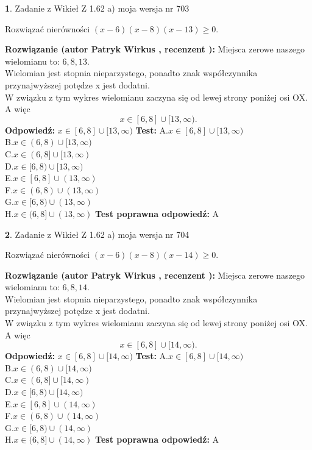 \documentclass[12pt, a4paper]{article}
\theoremstyle{definition} %
\newtheorem{zad}{}
\newcommand{\zadStart}[1]{\begin{zad}#1\newline}
\newcommand{\zadStop}{\end{zad}}
\newcommand{\rozwStart}[2]{\noindent \textbf{Rozwiązanie (autor #1 , recenzent #2): }\newline}
\newcommand{\rozwStop}{\newline}
\newcommand{\odpStart}{\noindent \textbf{Odpowiedź:}\newline}
\newcommand{\odpStop}{\newline}
\newcommand{\testStart}{\noindent \textbf{Test:}\newline}
\newcommand{\testStop}{\newline}
\newcommand{\kluczStart}{\noindent \textbf{Test poprawna odpowiedź:}\newline}
\newcommand{\kluczStop}{\newline}
\begin{document}
\zadStart{Zadanie z Wikieł Z 1.62 a) moja wersja nr 703}

Rozwiązać nierówności $(x-6)(x-8)(x-13)\ge0$.
\zadStop
\rozwStart{Patryk Wirkus}{}
Miejsca zerowe naszego wielomianu to: $6, 8, 13$.\\
Wielomian jest stopnia nieparzystego, ponadto znak współczynnika przy\linebreak najwyższej potędze x jest dodatni.\\ W związku z tym wykres wielomianu zaczyna się od lewej strony poniżej osi OX. A więc $$x \in [6,8] \cup [13,\infty).$$
\rozwStop
\odpStart
$x \in [6,8] \cup [13,\infty)$
\odpStop
\testStart
A.$x \in [6,8] \cup [13,\infty)$\\
B.$x \in (6,8) \cup [13,\infty)$\\
C.$x \in (6,8] \cup [13,\infty)$\\
D.$x \in [6,8) \cup [13,\infty)$\\
E.$x \in [6,8] \cup (13,\infty)$\\
F.$x \in (6,8) \cup (13,\infty)$\\
G.$x \in [6,8) \cup (13,\infty)$\\
H.$x \in (6,8] \cup (13,\infty)$
\testStop
\kluczStart
A
\kluczStop



\zadStart{Zadanie z Wikieł Z 1.62 a) moja wersja nr 704}

Rozwiązać nierówności $(x-6)(x-8)(x-14)\ge0$.
\zadStop
\rozwStart{Patryk Wirkus}{}
Miejsca zerowe naszego wielomianu to: $6, 8, 14$.\\
Wielomian jest stopnia nieparzystego, ponadto znak współczynnika przy\linebreak najwyższej potędze x jest dodatni.\\ W związku z tym wykres wielomianu zaczyna się od lewej strony poniżej osi OX. A więc $$x \in [6,8] \cup [14,\infty).$$
\rozwStop
\odpStart
$x \in [6,8] \cup [14,\infty)$
\odpStop
\testStart
A.$x \in [6,8] \cup [14,\infty)$\\
B.$x \in (6,8) \cup [14,\infty)$\\
C.$x \in (6,8] \cup [14,\infty)$\\
D.$x \in [6,8) \cup [14,\infty)$\\
E.$x \in [6,8] \cup (14,\infty)$\\
F.$x \in (6,8) \cup (14,\infty)$\\
G.$x \in [6,8) \cup (14,\infty)$\\
H.$x \in (6,8] \cup (14,\infty)$
\testStop
\kluczStart
A
\kluczStop
\end{document}
